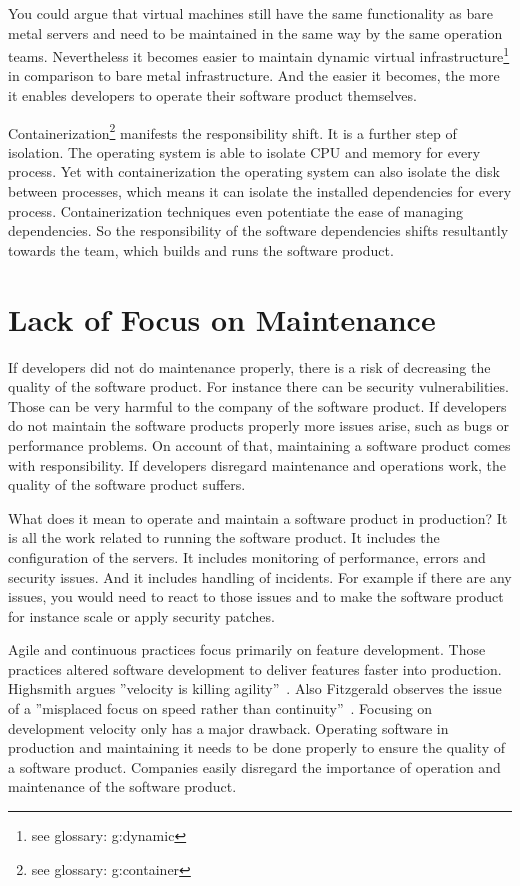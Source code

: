 You could argue that virtual machines still have the same functionality as bare metal
servers and need to be maintained in the same way by the same operation
teams. Nevertheless it becomes easier to maintain dynamic virtual
infrastructure\footnote{see glossary: \gls{g:dynamic}} in comparison to bare metal
infrastructure. And the easier it becomes, the more it enables developers to operate their
software product themselves.

Containerization\footnote{see glossary: \gls{g:container}} manifests the responsibility
shift. It is a further step of isolation. The operating system is able to isolate CPU and
memory for every process. Yet with containerization the operating system can also isolate
the disk between processes, which means it can isolate the installed dependencies for
every process. Containerization techniques even potentiate the ease of managing
dependencies. So the responsibility of the software dependencies shifts resultantly
towards the team, which builds and runs the software product.


\section{Lack of Focus on Maintenance}

If developers did not do maintenance properly, there is a risk of decreasing the quality
of the software product. For instance there can be security vulnerabilities. Those can be
very harmful to the company of the software product. If developers do not maintain the
software products properly more issues arise, such as bugs or performance problems. On
account of that, maintaining a software product comes with responsibility. If developers
disregard maintenance and operations work, the quality of the software product suffers.

What does it mean to operate and maintain a software product in production? It is all the
work related to running the software product. It includes the configuration of the
servers. It includes monitoring of performance, errors and security issues. And it
includes handling of incidents. For example if there are any issues, you would need to
react to those issues and to make the software product for instance scale or apply
security patches.

Agile and continuous practices focus primarily on feature development. Those practices
altered software development to deliver features faster into production. Highsmith argues
”velocity is killing agility”~\cite{velocity_kills}. Also Fitzgerald observes the issue of
a ”misplaced focus on speed rather than continuity”~\cite{continuous_fitzgerald}. Focusing
on development velocity only has a major drawback. Operating software in production and
maintaining it needs to be done properly to ensure the quality of a software
product. Companies easily disregard the importance of operation and maintenance of the
software product.


